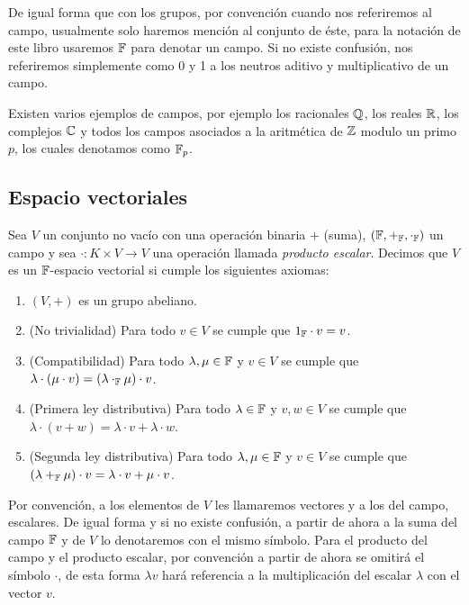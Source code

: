 De igual forma que con los grupos, por convención cuando nos referiremos al campo, usualmente solo haremos mención al conjunto de éste, para la notación de este libro usaremos $\mathbb{F}$ para denotar un campo. Si no existe confusión, nos referiremos simplemente como 0 y 1 a los neutros aditivo y multiplicativo de un campo.

Existen varios ejemplos de campos, por ejemplo los racionales $\mathbb{Q}$, los reales $\mathbb{R}$, los complejos $\mathbb{C}$ y todos los campos asociados a la aritmética de $\mathbb{Z}$ modulo un primo $p$, los cuales denotamos como $\mathbb{F}_p$.

\subsection{Espacio vectoriales}

\begin{defi}
  Sea $V$ un conjunto no vacío con una operación binaria $+$ (suma), $(\mathbb{F}, +_{\mathbb{F}}, \cdot_{\mathbb{F}} )$ un campo y sea $\cdot\colon K \times V \to V$ una operación llamada \emph{producto escalar}. Decimos que $V$ es un $\mathbb{F}$-espacio vectorial si cumple los siguientes axiomas:
  \begin{enumerate}
    \item $(V, +)$ es un grupo abeliano.
    \item (No trivialidad) Para todo $v \in V$ se cumple que $1_{\mathbb{F}} \cdot v = v$.
    \item (Compatibilidad) Para todo $\lambda, \mu \in \mathbb{F}$ y $v \in V$ se cumple que $\lambda \cdot (\mu \cdot v) = (\lambda \cdot_{\mathbb{F}} \mu)  \cdot v$.
    \item (Primera ley distributiva) Para todo $\lambda \in \mathbb{F}$ y $v,w \in V$ se cumple que $\lambda \cdot (v + w) = \lambda \cdot v + \lambda \cdot w$.
    \item (Segunda ley distributiva) Para todo $\lambda, \mu \in \mathbb{F}$ y $v\in V$ se cumple que $(\lambda +_{\mathbb{F}} \mu)\cdot v = \lambda \cdot v + \mu \cdot v$.
  \end{enumerate}
\end{defi}


Por convención, a los elementos de $V$ les llamaremos vectores y a los del campo, escalares. De igual forma y si no existe confusión, a partir de ahora a la suma del campo $\mathbb{F}$ y de $V$ lo denotaremos con el mismo símbolo. Para el producto del campo y el producto escalar, por convención a partir de ahora se omitirá el símbolo $\cdot$, de esta forma $\lambda v$ hará referencia a la multiplicación del escalar $\lambda$ con el vector $v$.

